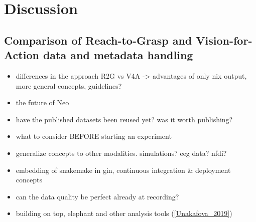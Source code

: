 \clearpage
\section{Discussion}
\label{sec:discussion}

\subsection{Comparison of Reach-to-Grasp and Vision-for-Action data and metadata handling}

\begin{itemize}
 \item differences in the approach R2G vs V4A -> advantages of only nix output, more general concepts, guidelines?
 \item the future of Neo
 \item have the published datasets been reused yet? was it worth publishing?
 \item what to consider BEFORE starting an experiment
 \item generalize concepts to other modalities. simulations? eeg data? nfdi?
 \item embedding of snakemake in gin, continuous integration & deployment concepts
 \item can the data quality be perfect already at recording?
 \item building on top, elephant and other analysis tools (\ref{Unakafova_2019})
\end{itemize}



% 
% 
% 

